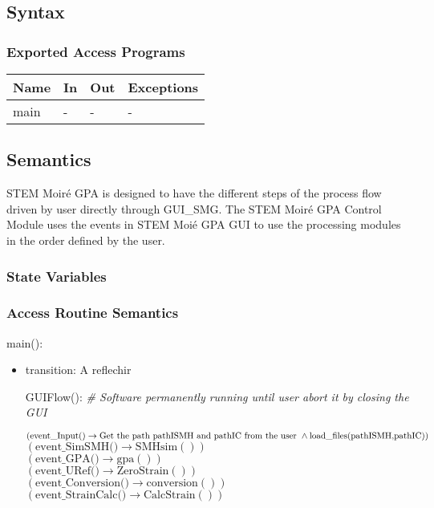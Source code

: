 \documentclass[12pt, titlepage]{article}
\newcommand{\progname}{STEM Moir{\'e} GPA}
\begin{document}
\subsection{Syntax}

\subsubsection{Exported Access Programs}

\begin{center}
\begin{tabular}{p{2cm} p{4cm} p{4cm} p{2cm}}
\hline
\textbf{Name} & \textbf{In} & \textbf{Out} & \textbf{Exceptions} \\
\hline
main & - & - & - \\
\hline
\end{tabular}
\end{center}

\subsection{Semantics}

\progname{} is designed to have the different steps of the process flow driven by user directly through GUI{\_}SMG. The STEM Moir{\'e} GPA Control Module uses the events in STEM Moi{\'e} GPA GUI to use the processing modules in the order defined by the user.

\subsubsection{State Variables}


\subsubsection{Access Routine Semantics}

\noindent main():
\begin{itemize}
\item transition: A reflechir 

GUIFlow():
\noindent\textit{{\#} Software permanently running until user abort it by closing the GUI} \medskip

$(\text{event{\_}Input()} \\ \rightarrow \text{Get the path pathISMH and pathIC from the user} \  \wedge \\ \text{load{\_}files(pathISMH,pathIC)})$\\
$(\text{event{\_}SimSMH()} \rightarrow \text{SMHsim}())$\\
$(\text{event{\_}GPA()} \rightarrow \text{gpa}())$\\
$(\text{event{\_}URef()} \rightarrow \text{ZeroStrain}())$\\
$(\text{event{\_}Conversion()} \rightarrow \text{conversion}())$\\
$(\text{event{\_}StrainCalc()} \rightarrow \text{CalcStrain}())$\\

\end{itemize}
\end{document}
